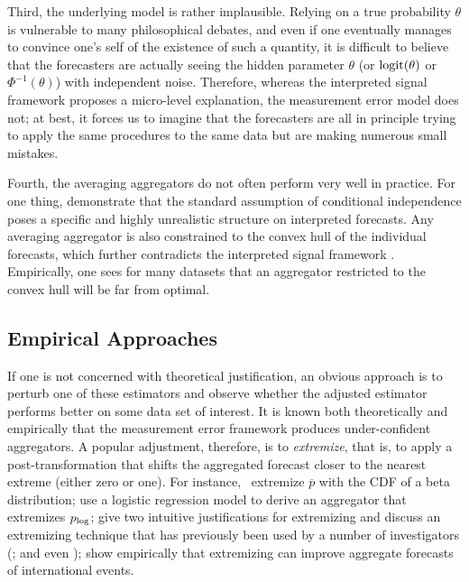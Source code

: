\documentclass[12pt]{article}
\theoremstyle{definition}
\theoremstyle{definition}
\def\pb{\overline{p}}
\def\logit{{\rm logit}}
\def\plog{p_{\rm log}}
\begin{document}

Third,  the
underlying model is rather implausible. Relying on a true probability $\theta$ is vulnerable to
many philosophical debates, and even if one eventually manages to
convince one's self of the existence of such a quantity, it is
difficult to believe that the forecasters are actually seeing the
hidden parameter $\theta$ (or $\logit(\theta)$ or
$\Phi^{-1}(\theta)$) with independent noise. Therefore, whereas the
interpreted signal framework proposes a micro-level explanation, the
measurement error model does not; at best, it forces us to imagine that
the forecasters are all in principle trying to apply the same
procedures to the same data but are making numerous small mistakes. 

Fourth, the averaging aggregators do not often perform
very well in practice. For one thing,  \citet{hong2009interpreted} demonstrate that the standard
assumption of conditional independence poses a specific and highly
unrealistic structure on interpreted forecasts. Any averaging aggregator is also constrained to
the convex hull of the individual forecasts, which further contradicts the
interpreted signal framework \citep{parunak2013characterizing}.  Empirically, one sees
for many datasets that an aggregator restricted to the convex hull
will be far from optimal.

\subsection{Empirical Approaches}
\label{ss:empirical}

If one is not concerned with theoretical justification, an obvious
approach is to perturb one of these estimators and observe whether the
adjusted estimator performs better on some data set of interest.  It
is known both theoretically and empirically that the measurement error
framework produces under-confident aggregators.  A popular adjustment,
therefore, is to {\em extremize}, that is, to apply a
post-transformation that shifts the aggregated forecast closer to the
nearest extreme (either zero or one).  For instance,~\citet{Ranjan08} 
extremize $\pb$ with the CDF of a
beta distribution; \citet{satopaa} use a logistic
regression model to derive an aggregator that extremizes $\plog$; \citet{baron2014two} give two intuitive justifications for
extremizing and discuss an extremizing technique that has previously
been used by a number of investigators (\citealt{Erev1994,
shlomi2010subjective}; and even \citealt{karmarkar1978subjectively}); \citet{mellers2014psychological} show empirically that extremizing can
improve aggregate forecasts of international events.
\end{document}

